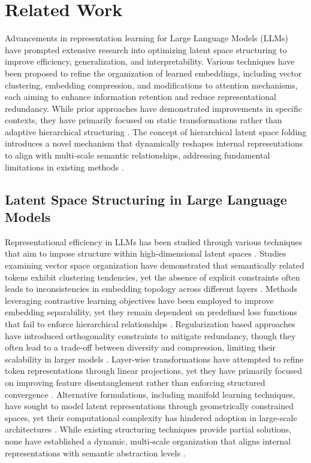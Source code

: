 \documentclass[5p,times]{elsarticle}
\begin{document}
\section{Related Work}

Advancements in representation learning for Large Language Models (LLMs) have prompted extensive research into optimizing latent space structuring to improve efficiency, generalization, and interpretability. Various techniques have been proposed to refine the organization of learned embeddings, including vector clustering, embedding compression, and modifications to attention mechanisms, each aiming to enhance information retention and reduce representational redundancy. While prior approaches have demonstrated improvements in specific contexts, they have primarily focused on static transformations rather than adaptive hierarchical structuring \cite{troy2024dynamic}. The concept of hierarchical latent space folding introduces a novel mechanism that dynamically reshapes internal representations to align with multi-scale semantic relationships, addressing fundamental limitations in existing methods \cite{mccartney2024introducing}. 

\subsection{Latent Space Structuring in Large Language Models}

Representational efficiency in LLMs has been studied through various techniques that aim to impose structure within high-dimensional latent spaces \cite{lemal2024dynamic}. Studies examining vector space organization have demonstrated that semantically related tokens exhibit clustering tendencies, yet the absence of explicit constraints often leads to inconsistencies in embedding topology across different layers \cite{ hu2024dynamic}. Methods leveraging contrastive learning objectives have been employed to improve embedding separability, yet they remain dependent on predefined loss functions that fail to enforce hierarchical relationships \cite{kiritani2024mitigating}. Regularization based approaches have introduced orthogonality constraints to mitigate redundancy, though they often lead to a trade-off between diversity and compression, limiting their scalability in larger models \cite{wilson2024contextual}. Layer-wise transformations have attempted to refine token representations through linear projections, yet they have primarily focused on improving feature disentanglement rather than enforcing structured convergence \cite{yuan2024comparative}. Alternative formulations, including manifold learning techniques, have sought to model latent representations through geometrically constrained spaces, yet their computational complexity has hindered adoption in large-scale architectures \cite{giacomozzi2024innovative, monafal2024optimizing}. While existing structuring techniques provide partial solutions, none have established a dynamic, multi-scale organization that aligns internal representations with semantic abstraction levels \cite{vaillancourt2024instruction}.
\end{document}
